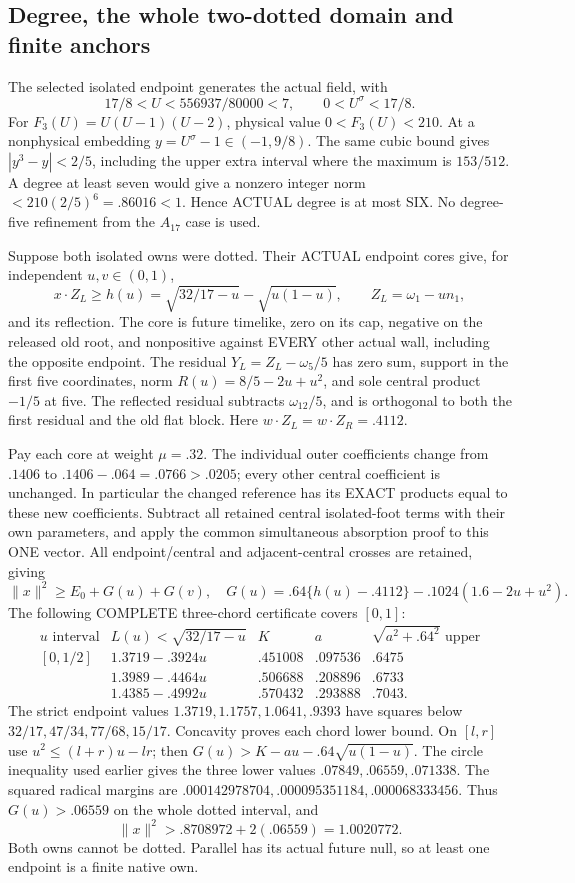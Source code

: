 \subsection{Degree, the whole two-dotted domain and finite anchors}
\label{app:arithA16anchors}

The selected isolated endpoint generates the actual field, with
\[
 17/8<U<556937/80000<7,\qquad0<U^\sigma<17/8 .
\]
For \(F_3(U)=U(U-1)(U-2)\), physical value \(0<F_3(U)<210\).
At a nonphysical embedding \(y=U^\sigma-1\in(-1,9/8)\).
The same cubic bound gives
\(|y^3-y|<2/5\), including the upper extra interval where
the maximum is \(153/512\).
A degree at least seven would give a nonzero integer norm
\(<210(2/5)^6=.86016<1\).
Hence ACTUAL degree is at most SIX.
No degree-five refinement from the \(A_{17}\) case is used.

Suppose both isolated owns were dotted.
Their ACTUAL endpoint cores give, for independent \(u,v\in(0,1)\),
\[
 x\cdot Z_L\ge h(u)=\sqrt{32/17-u}-\sqrt{u(1-u)},\qquad
 Z_L=\omega_1-un_1 ,
\]
and its reflection.
The core is future timelike, zero on its cap, negative on the
released old root, and nonpositive against EVERY other actual
wall, including the opposite endpoint.
The residual \(Y_L=Z_L-\omega_5/5\) has zero sum,
support in the first five coordinates, norm
\(R(u)=8/5-2u+u^2\), and sole central product \(-1/5\)
at five.
The reflected residual subtracts \(\omega_{12}/5\), and is
orthogonal to both the first residual and the old flat block.
Here \(w\cdot Z_L=w\cdot Z_R=.4112\).

Pay each core at weight \(\mu=.32\).
The individual outer coefficients change from \(.1406\) to
\(.1406-.064=.0766>.0205\);
every other central coefficient is unchanged.
In particular the changed reference has its EXACT products
equal to these new coefficients.
Subtract all retained central isolated-foot terms with their
own parameters, and apply the common simultaneous absorption
proof to this ONE vector.
All endpoint/central and adjacent-central crosses are retained,
giving
\[
 \|x\|^2\ge E_0+G(u)+G(v),\quad
 G(u)=.64\{h(u)-.4112\}-.1024(1.6-2u+u^2).
\]
The following COMPLETE three-chord certificate covers \([0,1]\):
\[
\begin{array}{c|c|c|c|c}
u\text{ interval}&L(u)<\sqrt{32/17-u}&K&a&
 \sqrt{a^2+.64^2}\text{ upper}\\ \hline
[0,1/2]&1.3719-.3924u&.451008&.097536&.6475\\
[1/2,3/4]&1.3989-.4464u&.506688&.208896&.6733\\
[3/4,1]&1.4385-.4992u&.570432&.293888&.7043 .
\end{array}
\]
The strict endpoint values \(1.3719,1.1757,1.0641,.9393\)
have squares below \(32/17,47/34,77/68,15/17\).
Concavity proves each chord lower bound.
On \([l,r]\) use \(u^2\le(l+r)u-lr\);
then \(G(u)>K-au-.64\sqrt{u(1-u)}\).
The circle inequality used earlier gives the three lower values
\(.07849,.06559,.071338\).
The squared radical margins are
\(.000142978704,.000095351184,.000068333456\).
Thus \(G(u)>.06559\) on the whole dotted interval, and
\[
                  \|x\|^2>.8708972+2(.06559)=1.0020772 .
\]
Both owns cannot be dotted.
Parallel has its actual future null, so at least one endpoint
is a finite native own.

